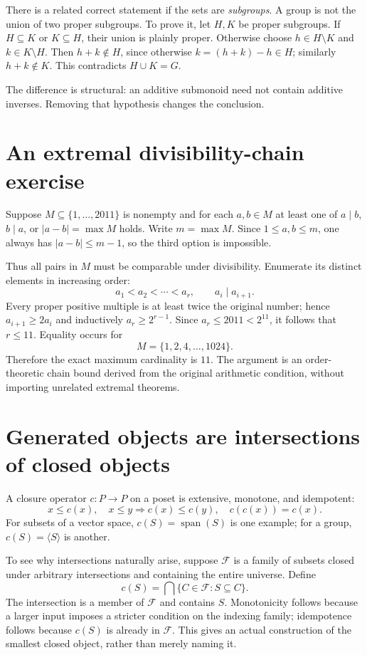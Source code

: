 There is a related correct statement if the sets are \emph{subgroups}. A group is not the union of two proper subgroups. To prove it, let \(H,K\) be proper subgroups. If \(H\subseteq K\) or \(K\subseteq H\), their union is plainly proper. Otherwise choose \(h\in H\setminus K\) and \(k\in K\setminus H\). Then \(h+k\notin H\), since otherwise \(k=(h+k)-h\in H\); similarly \(h+k\notin K\). This contradicts \(H\cup K=G\).

The difference is structural: an additive submonoid need not contain additive inverses. Removing that hypothesis changes the conclusion.

\section{An extremal divisibility-chain exercise}

Suppose \(M\subseteq\{1,\ldots,2011\}\) is nonempty and for each \(a,b\in M\) at least one of \(a\mid b\), \(b\mid a\), or \(|a-b|=\max M\) holds. Write \(m=\max M\). Since \(1\le a,b\le m\), one always has \(|a-b|\le m-1\), so the third option is impossible.

Thus all pairs in \(M\) must be comparable under divisibility. Enumerate its distinct elements in increasing order:
\[
 a_1<a_2<\cdots<a_r,\qquad a_i\mid a_{i+1}.
\]
Every proper positive multiple is at least twice the original number; hence \(a_{i+1}\ge2a_i\) and inductively \(a_r\ge2^{r-1}\). Since \(a_r\le2011<2^{11}\), it follows that \(r\le11\). Equality occurs for
\[
 M=\{1,2,4,\ldots,1024\}.
\]
Therefore the exact maximum cardinality is \(11\). The argument is an order-theoretic chain bound derived from the original arithmetic condition, without importing unrelated extremal theorems.

\section{Generated objects are intersections of closed objects}

A closure operator \(c:P\to P\) on a poset is extensive, monotone, and idempotent:
\[
 x\le c(x),\quad x\le y\Rightarrow c(x)\le c(y),\quad c(c(x))=c(x).
\]
For subsets of a vector space, \(c(S)=\operatorname{span}(S)\) is one example; for a group, \(c(S)=\langle S\rangle\) is another.

To see why intersections naturally arise, suppose \(\mathcal F\) is a family of subsets closed under arbitrary intersections and containing the entire universe. Define
\[
 c(S)=\bigcap\{C\in\mathcal F:S\subseteq C\}.
\]
The intersection is a member of \(\mathcal F\) and contains \(S\). Monotonicity follows because a larger input imposes a stricter condition on the indexing family; idempotence follows because \(c(S)\) is already in \(\mathcal F\). This gives an actual construction of the smallest closed object, rather than merely naming it.


